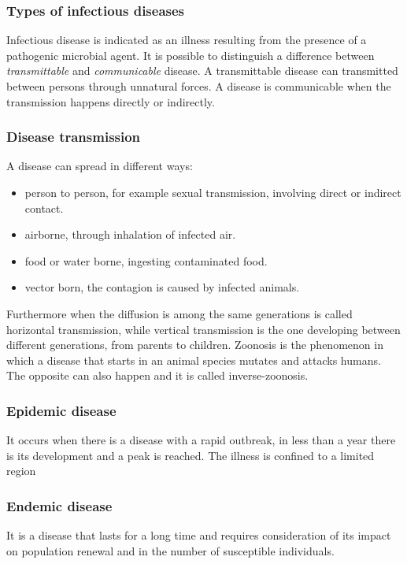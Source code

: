 \subsubsection{Types of infectious diseases}
Infectious disease is indicated as an illness resulting from the presence of a pathogenic microbial agent. It is possible to distinguish a difference between \textit{transmittable} and \textit{communicable} disease. A transmittable disease can transmitted between persons through unnatural forces. A disease is communicable when the transmission happens directly or indirectly.

\subsubsection{Disease transmission} A disease can spread in different ways: 
	\begin{itemize}
		\item person to person, for example sexual transmission, involving direct or indirect contact.
		\item airborne, through inhalation of infected air.
		\item food or water borne, ingesting contaminated food. 
		\item vector born, the contagion is caused by infected animals.
	\end{itemize}
	Furthermore when the diffusion is among the same generations is called horizontal transmission, while vertical transmission is the one developing between different generations, from parents to children. 
	Zoonosis is the phenomenon in which a disease that starts in an animal species mutates and attacks humans. The opposite can also happen and it is called inverse-zoonosis. 
	
\subsubsection{Epidemic disease} It occurs when there is a disease with a rapid outbreak, in less than a year there is its development and a peak is reached. The illness is confined to a limited region

\subsubsection{Endemic disease} It is a disease that lasts for a long time and requires consideration of its impact on population renewal and in the number of susceptible individuals.

